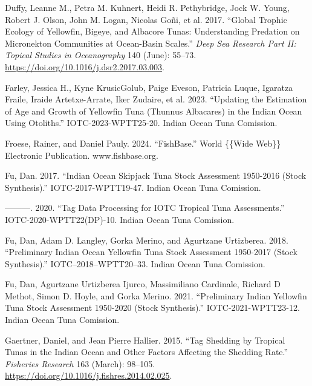 \documentclass[
]{scrartcl}
\newlength{\cslhangindent}
\newenvironment{CSLReferences}[2] %
 {\begin{list}{}{%
  \setlength{\itemindent}{0pt}
  \setlength{\leftmargin}{0pt}
  \setlength{\parsep}{0pt}
  \ifodd #1
   \setlength{\leftmargin}{\cslhangindent}
   \setlength{\itemindent}{-1\cslhangindent}
  \fi
  \setlength{\itemsep}{#2\baselineskip}}}
 {\end{list}}
\begin{document}
\begin{CSLReferences}{1}{0}
Duffy, Leanne M., Petra M. Kuhnert, Heidi R. Pethybridge, Jock W. Young,
Robert J. Olson, John M. Logan, Nicolas Goñi, et al. 2017. {``Global
Trophic Ecology of Yellowfin, Bigeye, and Albacore Tunas:
{Understanding} Predation on Micronekton Communities at Ocean-Basin
Scales.''} \emph{Deep Sea Research Part II: Topical Studies in
Oceanography} 140 (June): 55--73.
\url{https://doi.org/10.1016/j.dsr2.2017.03.003}.

Farley, Jessica H., Kyne KrusicGolub, Paige Eveson, Patricia Luque,
Igaratza Fraile, Iraide Artetxe-Arrate, Iker Zudaire, et al. 2023.
{``Updating the Estimation of Age and Growth of Yellowfin Tuna
({Thunnus} Albacares) in the {Indian Ocean} Using Otoliths.''}
IOTC-2023-WPTT25-20. Indian Ocean Tuna Comission.

Froese, Rainer, and Daniel Pauly. 2024. {``{FishBase}.''} World \{\{Wide
Web\}\} Electronic Publication. www.fishbase.org.

Fu, Dan. 2017. {``Indian Ocean Skipjack Tuna Stock Assessment 1950-2016
({Stock Synthesis}).''} IOTC-2017-WPTT19-47. Indian Ocean Tuna
Comission.

---------. 2020. {``Tag Data Processing for {IOTC} Tropical Tuna
Assessments.''} IOTC-2020-WPTT22(DP)-10. Indian Ocean Tuna Comission.

Fu, Dan, Adam D. Langley, Gorka Merino, and Agurtzane Urtizberea. 2018.
{``Preliminary {Indian Ocean Yellowfin Tuna Stock Assessment} 1950-2017
({Stock Synthesis}).''} IOTC--2018--WPTT20--33. Indian Ocean Tuna
Comission.

Fu, Dan, Agurtzane Urtizberea Ijurco, Massimiliano Cardinale, Richard D
Methot, Simon D. Hoyle, and Gorka Merino. 2021. {``Preliminary {Indian
Yellowfin} Tuna Stock Assessment 1950-2020 ({Stock Synthesis}).''}
IOTC-2021-WPTT23-12. Indian Ocean Tuna Comission.

Gaertner, Daniel, and Jean Pierre Hallier. 2015. {``Tag Shedding by
Tropical Tunas in the {Indian Ocean} and Other Factors Affecting the
Shedding Rate.''} \emph{Fisheries Research} 163 (March): 98--105.
\url{https://doi.org/10.1016/j.fishres.2014.02.025}.


\end{CSLReferences}
\end{document}
